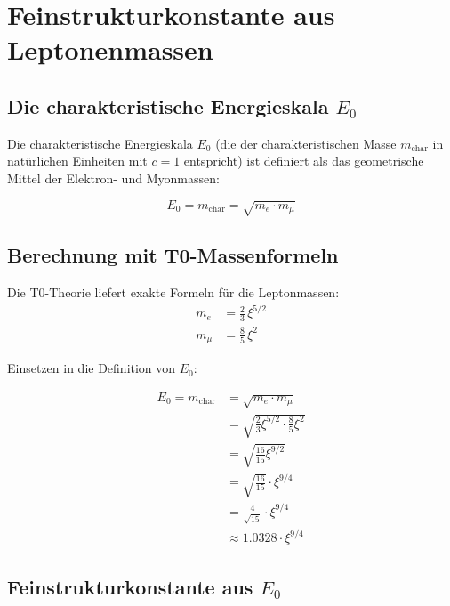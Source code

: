 \documentclass[12pt,a4paper]{article}
\newcommand{\xipar}{\xi}
\begin{document}
	\section{Feinstrukturkonstante aus Leptonenmassen}
	
	\subsection{Die charakteristische Energieskala $E_0$}
	
	Die charakteristische Energieskala $E_0$ (die der charakteristischen Masse $m_{\text{char}}$ in nat\"urlichen Einheiten mit $c=1$ entspricht) ist definiert als das geometrische Mittel der Elektron- und Myonmassen:
	
	\begin{equation}
		E_0 = m_{\text{char}} = \sqrt{m_e \cdot m_\mu}
	\end{equation}
	
	\subsection{Berechnung mit T0-Massenformeln}
	
	Die T0-Theorie liefert exakte Formeln f\"ur die Leptonmassen:
	\begin{align}
		m_e &= \frac{2}{3} \, \xipar^{5/2} \\
		m_\mu &= \frac{8}{5} \, \xipar^2
	\end{align}
	
	Einsetzen in die Definition von $E_0$:
	
	\begin{align}
		E_0 = m_{\text{char}} &= \sqrt{m_e \cdot m_\mu} \\
		&= \sqrt{\frac{2}{3} \xipar^{5/2} \cdot \frac{8}{5} \xipar^2} \\
		&= \sqrt{\frac{16}{15} \xipar^{9/2}} \\
		&= \sqrt{\frac{16}{15}} \cdot \xipar^{9/4} \\
		&= \frac{4}{\sqrt{15}} \cdot \xipar^{9/4} \\
		&\approx 1.0328 \cdot \xipar^{9/4}
	\end{align}
	
	\subsection{Feinstrukturkonstante aus $E_0$}
	
\end{document}

